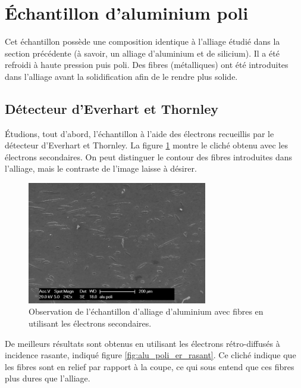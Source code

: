 \documentclass[a4paper,12pt]{article}
\newcommand\ett{Everhart et Thornley\xspace}
\begin{document}
\section{Échantillon d'aluminium poli}

Cet échantillon possède une composition identique à l'alliage étudié dans la section précédente (à savoir, un alliage d'aluminium et de silicium). 
Il a été refroidi à haute pression puis poli.
Des fibres (métalliques) ont été introduites dans l'alliage avant la solidification afin de le rendre plus solide.

\subsection{Détecteur d'\ett}

Étudions, tout d'abord, l'échantillon à l'aide des électrons recueillis par le détecteur d'\ett. 
La figure \ref{fig:alu_poli_es} montre le cliché obtenu avec les électrons secondaires.
On peut distinguer le contour des fibres introduites dans l'alliage, mais le contraste de l'image laisse 
à désirer.

\begin{figure}
\centering
\includegraphics[width=0.7\textwidth]{images/alu_es.png}
\caption{Observation de l'échantillon d'alliage d'aluminium avec fibres en utilisant les électrons secondaires.}
\label{fig:alu_poli_es}
\end{figure}

De meilleurs résultats sont obtenus en utilisant les électrons rétro-diffusés à incidence rasante, indiqué figure \ref{fig:alu_poli_er_rasant}.
Ce cliché indique que les fibres sont en relief par rapport à la coupe, ce qui sous entend que ces fibres plus dures que l'alliage.
\end{document}
